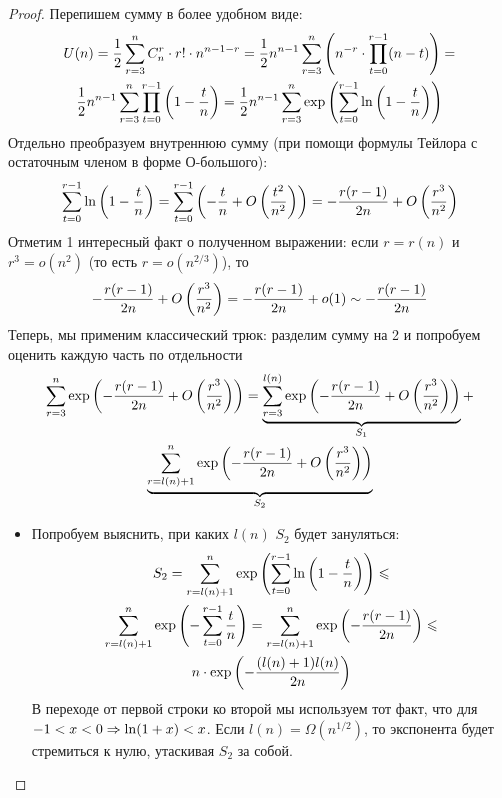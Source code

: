 \begin{proof}
	Перепишем сумму в более удобном виде:
	\begin{multline*}
		U(n) = \frac{1}{2} \sum_{r = 3}^n C_n^r \cdot r! \cdot n^{n - 1 - r} = \frac{1}{2} n^{n - 1} \sum_{r = 3}^n \left(n^{-r} \cdot \prod_{t = 0}^ {r - 1} (n - t)\right) =
		\\
		\frac{1}{2} n^{n - 1} \sum_{r = 3}^n \prod_{t = 0}^{r - 1} \left(1 - \frac{t}{n}\right) = \frac{1}{2} n^{n - 1} \sum_{r = 3}^n \exp\left(\sum_{t = 0}^{r - 1} \ln\left(1 - \frac{t}{n}\right)\right)
	\end{multline*}
	Отдельно преобразуем внутреннюю сумму (при помощи формулы Тейлора с остаточным членом в форме О-большого):
	\[
		\sum_{t = 0}^{r - 1} \ln\left(1 - \frac{t}{n}\right) = \sum_{t = 0}^{r - 1} \left(-\frac{t}{n} + O\left(\frac{t^2}{n^2}\right)\right) = -\frac{r(r - 1)}{2n} + O\left(\frac{r^3}{n^2}\right)
	\]
	Отметим 1 интересный факт о полученном выражении: если $r = r(n)$ и $r^3 = o(n^2)$ (то есть $r = o(n^{2/3})$), то
	\[
		-\frac{r(r - 1)}{2n} + O\left(\frac{r^3}{n^2}\right) = -\frac{r(r - 1)}{2n} + o(1) \sim -\frac{r(r - 1)}{2n}
	\]
	Теперь, мы применим классический трюк: разделим сумму на 2 и попробуем оценить каждую часть по отдельности
	\begin{multline*}
		\sum_{r = 3}^n \exp\left(-\frac{r(r - 1)}{2n} + O\left(\frac{r^3}{n^2}\right)\right) = \underbrace{\sum_{r = 3}^{l(n)} \exp\left(-\frac{r(r - 1)}{2n} + O\left(\frac{r^3}{n^2}\right)\right)}_{S_1} +
		\\
		\underbrace{\sum_{r = l(n) + 1}^n \exp\left(-\frac{r(r - 1)}{2n} + O\left(\frac{r^3}{n^2}\right)\right)}_{S_2}
	\end{multline*}
	\begin{itemize}
		\item Попробуем выяснить, при каких $l(n)$ $S_2$ будет зануляться:
		\begin{multline*}
			S_2 = \sum_{r = l(n) + 1}^n \exp\left(\sum_{t = 0}^{r - 1} \ln\left(1 - \frac{t}{n}\right)\right) \leqslant
			\\
			\sum_{r = l(n) + 1}^n \exp\left(-\sum_{t = 0}^{r - 1} \frac{t}{n}\right) = \sum_{r = l(n) + 1}^n \exp\left(-\frac{r(r - 1)}{2n}\right) \leqslant
			\\
			n \cdot \exp\left(-\frac{(l(n) + 1)l(n)}{2n}\right)
		\end{multline*}
		В переходе от первой строки ко второй мы используем тот факт, что для $-1 < x < 0 \Rightarrow \ln(1 + x) < x$. Если $l(n) = \Omega(n^{1/2})$, то экспонента будет стремиться к нулю, утаскивая $S_2$ за собой.
		

\end{itemize}
\end{proof}
